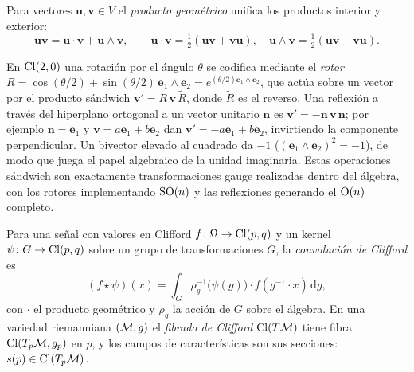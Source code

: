 \begin{definition}
\label{def:gauge:geometric-product}
Para vectores $\mathbf{u}, \mathbf{v} \in V$ el \emph{producto geom\'etrico}
unifica los productos interior y exterior:
\[
  \mathbf{u}\mathbf{v} = \mathbf{u}\cdot\mathbf{v} + \mathbf{u}\wedge\mathbf{v},
  \qquad
  \mathbf{u}\cdot\mathbf{v} = \tfrac{1}{2}(\mathbf{u}\mathbf{v} +
  \mathbf{v}\mathbf{u}),
  \quad
  \mathbf{u}\wedge\mathbf{v} = \tfrac{1}{2}(\mathbf{u}\mathbf{v} -
  \mathbf{v}\mathbf{u}).
\]
\end{definition}

\begin{example}
\label{ex:gauge:rotors}
En $\operatorname{Cl}(2,0)$ una rotaci\'on por el \'angulo $\theta$ se codifica mediante el
\emph{rotor} $R = \cos(\theta/2) + \sin(\theta/2)\,\mathbf{e}_1\wedge\mathbf{e}_2 =
e^{(\theta/2)\mathbf{e}_1\wedge\mathbf{e}_2}$, que act\'ua sobre un vector por el
producto s\'andwich $\mathbf{v}' = R\,\mathbf{v}\,\widetilde{R}$, donde
$\widetilde{R}$ es el reverso. Una reflexi\'on a trav\'es del hiperplano
ortogonal a un vector unitario $\mathbf{n}$ es $\mathbf{v}' =
-\mathbf{n}\,\mathbf{v}\,\mathbf{n}$; por ejemplo $\mathbf{n} = \mathbf{e}_1$ y
$\mathbf{v} = a\mathbf{e}_1 + b\mathbf{e}_2$ dan $\mathbf{v}' = -a\mathbf{e}_1 +
b\mathbf{e}_2$, invirtiendo la componente perpendicular. Un bivector elevado al
cuadrado da $-1$ ($(\mathbf{e}_1\wedge\mathbf{e}_2)^2 = -1$), de modo que juega el
papel algebraico de la unidad imaginaria. Estas operaciones s\'andwich son
exactamente transformaciones gauge realizadas dentro del \'algebra, con los
rotores implementando $\operatorname{SO}(n)$ y las reflexiones generando el $\operatorname{O}(n)$ completo.
\end{example}

\begin{definition}
\label{def:gauge:clifford-conv}
Para una se\~nal con valores en Clifford $f\colon \Omega \to \operatorname{Cl}(p,q)$ y un kernel
$\psi\colon G \to \operatorname{Cl}(p,q)$ sobre un grupo de transformaciones $G$, la
\emph{convoluci\'on de Clifford} es
\[
  (f \star \psi)(x) = \int_G \rho_g^{-1}\big(\psi(g)\big)\cdot f(g^{-1}\cdot x)\,
  \mathrm{d}g,
\]
con $\cdot$ el producto geom\'etrico y $\rho_g$ la acci\'on de $G$ sobre el
\'algebra. En una variedad riemanniana $(\mathcal{M}, g)$ el \emph{fibrado de Clifford}
$\operatorname{Cl}(T\mathcal{M})$ tiene fibra $\operatorname{Cl}(T_p\mathcal{M}, g_p)$ en $p$, y los campos de
caracter\'isticas son sus secciones: $s(p) \in \operatorname{Cl}(T_p\mathcal{M})$.
\end{definition}

